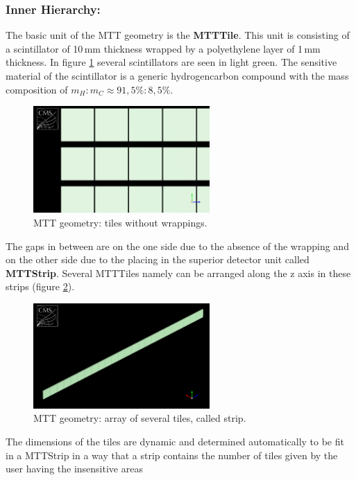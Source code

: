 			\subsubsection*{Inner Hierarchy:}
			The basic unit of the MTT geometry is the \textbf{MTTTile}.
			This unit is consisting of a scintillator of 10\,mm thickness wrapped by a polyethylene layer of 1\,mm thickness.
			In figure \ref{fig:tile_wowrapping} several scintillators are seen in light green.
			The sensitive material of the scintillator is a generic hydrogencarbon compound with the mass composition of $m_H:m_C \approx 91,5\%:8,5\%$.
			\begin{figure}[htbp]
				\centering
				\includegraphics[width=0.6\textwidth]{Figures/erdogan/tile_wowrapping.png}
				\caption{MTT geometry: tiles without wrappings.}
				\label{fig:tile_wowrapping}
			\end{figure}
			The gaps in between are on the one side due to the absence of the wrapping and on the other side due to the placing in the superior detector unit called \textbf{MTTStrip}.
			Several MTTTiles namely can be arranged along the z axis in these strips (figure \ref{fig:strip}).
			\begin{figure}[htbp]
				\centering
				\includegraphics[width=0.6\textwidth]{Figures/erdogan/strip.png}
				\caption{MTT geometry: array of several tiles, called strip.}
				\label{fig:strip}
			\end{figure}
			The dimensions of the tiles are dynamic and determined automatically to be fit in a MTTStrip in a way that a strip contains the number of tiles given by the user having the insensitive areas
